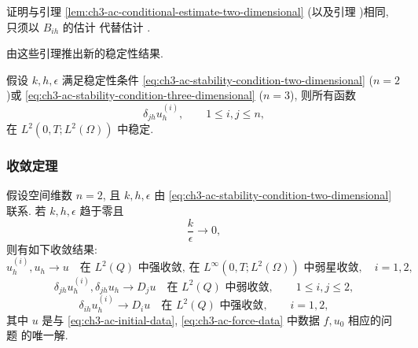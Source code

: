 \begin{Proof}
证明与引理 \ref{lem:ch3-ac-conditional-estimate-two-dimensional} (以及引理 )相同, 只须以 $B_{ih}$ 的估计  代替估计 .
\end{Proof}

由这些引理推出新的稳定性结果.

\begin{Theorem}
\label{thm:ch3-ac-conditional-stability}
假设 $k,h,\epsilon$ 满足稳定性条件 \eqref{eq:ch3-ac-stability-condition-two-dimensional} ($n=2$)或 \eqref{eq:ch3-ac-stability-condition-three-dimensional} ($n=3$), 则所有函数
\[
\delta_{jh}u_h^{(i)},
\qquad1\leq i,j\leq n,
\]
在 $L^2(0,T;L^2(\Omega))$ 中稳定.
\end{Theorem}

\hypertarget{chapter-03-page-321}{}
\subsubsection{收敛定理}
\label{subsubsec:ch3-ac-convergence-theorems}

\begin{Theorem}
\label{thm:ch3-ac-discrete-convergence-two-dimensional}
假设空间维数 $n=2$, 且 $k,h,\epsilon$ 由 \eqref{eq:ch3-ac-stability-condition-two-dimensional} 联系. 若 $k,h,\epsilon$ 趋于零且
\begin{equation}
\frac k\epsilon\longrightarrow0,
\label{eq:ch3-ac-time-compressibility-ratio}
\end{equation}
则有如下收敛结果:
\begin{equation}
u_h^{(i)},u_h\longrightarrow u
\quad\text{在 }L^2(Q)\text{ 中强收敛, 在 }
L^\infty(0,T;L^2(\Omega))\text{ 中弱星收敛},
\quad i=1,2,
\label{eq:ch3-ac-discrete-convergence-2d-velocity}
\end{equation}
\begin{equation}
\delta_{jh}u_h^{(i)},\delta_{jh}u_h
\longrightarrow D_j u
\quad\text{在 }L^2(Q)\text{ 中弱收敛},
\qquad1\leq i,j\leq2,
\label{eq:ch3-ac-discrete-convergence-2d-derivatives}
\end{equation}
\begin{equation}
\delta_{ih}u_h^{(i)}\longrightarrow D_i u
\quad\text{在 }L^2(Q)\text{ 中强收敛},
\qquad i=1,2,
\label{eq:ch3-ac-discrete-convergence-2d-strong-directional}
\end{equation}
其中 $u$ 是与 \eqref{eq:ch3-ac-initial-data}, \eqref{eq:ch3-ac-force-data} 中数据 $f,u_0$ 相应的问题  的唯一解.
\end{Theorem}

